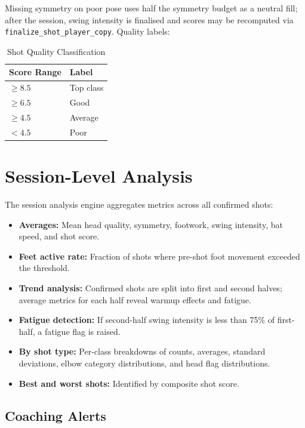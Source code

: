 \begin{justify}
\par Missing symmetry on poor pose uses half the symmetry budget as a neutral fill; after the session, swing intensity is finalised and scores may be recomputed via \texttt{finalize\_shot\_player\_copy}. Quality labels:

\begin{table}[ht]
\centering
\caption{Shot Quality Classification}
\label{tab:quality}
\begin{tabular}{l l}
 \hline
 \textbf{Score Range} & \textbf{Label} \\
 \hline
 $\geq 8.5$ & Top class \\
 $\geq 6.5$ & Good \\
 $\geq 4.5$ & Average \\
 $< 4.5$ & Poor \\
 \hline
\end{tabular}
\end{table}

\section{Session-Level Analysis}

\par The session analysis engine aggregates metrics across all confirmed shots:

\begin{itemize}
    \item \textbf{Averages:} Mean head quality, symmetry, footwork, swing intensity, bat speed, and shot score.
    \item \textbf{Feet active rate:} Fraction of shots where pre-shot foot movement exceeded the threshold.
    \item \textbf{Trend analysis:} Confirmed shots are split into first and second halves; average metrics for each half reveal warmup effects and fatigue.
    \item \textbf{Fatigue detection:} If second-half swing intensity is less than 75\% of first-half, a fatigue flag is raised.
    \item \textbf{By shot type:} Per-class breakdowns of counts, averages, standard deviations, elbow category distributions, and head flag distributions.
    \item \textbf{Best and worst shots:} Identified by composite shot score.
\end{itemize}

\subsection{Coaching Alerts}


\end{justify}
